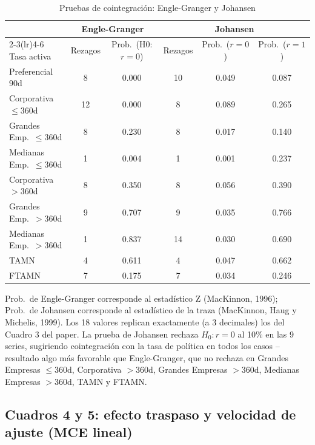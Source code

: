 \documentclass[12pt, letterpaper]{article}
\begin{document}
\begin{table}[ht]
\renewcommand{\thetable}{3}
\begin{threeparttable}
\caption{Pruebas de cointegración: Engle-Granger y Johansen}
\label{tab:cuadro3}
\small
\begin{tabular}{lccccc}
\toprule
& \multicolumn{2}{c}{Engle-Granger} & \multicolumn{3}{c}{Johansen}\\
\cmidrule(lr){2-3}\cmidrule(lr){4-6}
Tasa activa & Rezagos & Prob.\ (H0: $r=0$) & Rezagos & Prob.\ ($r=0$) & Prob.\ ($r=1$)\\
\midrule
Preferencial 90d        & 8  & 0.000 & 10 & 0.049 & 0.087 \\
Corporativa $\le$360d   & 12 & 0.000 & 8  & 0.089 & 0.265 \\
Grandes Emp.\ $\le$360d & 8  & 0.230 & 8  & 0.017 & 0.140 \\
Medianas Emp.\ $\le$360d& 1  & 0.004 & 1  & 0.001 & 0.237 \\
Corporativa $>$360d     & 8  & 0.350 & 8  & 0.056 & 0.390 \\
Grandes Emp.\ $>$360d   & 9  & 0.707 & 9  & 0.035 & 0.766 \\
Medianas Emp.\ $>$360d  & 1  & 0.837 & 14 & 0.030 & 0.690 \\
TAMN                    & 4  & 0.611 & 4  & 0.047 & 0.662 \\
FTAMN                   & 7  & 0.175 & 7  & 0.034 & 0.246 \\
\bottomrule
\end{tabular}
\begin{tablenotes}[flushleft]
\footnotesize\item
Prob.\ de Engle-Granger corresponde al estadístico Z (MacKinnon, 1996);
Prob.\ de Johansen corresponde al estadístico de la traza (MacKinnon,
Haug y Michelis, 1999). Los 18 valores replican exactamente (a 3
decimales) los del Cuadro 3 del paper. La prueba de Johansen rechaza
$H_0: r=0$ al 10\% en las 9 series, sugiriendo cointegración con la
tasa de política en todos los casos -- resultado algo más favorable
que Engle-Granger, que no rechaza en Grandes Empresas $\le$360d,
Corporativa $>$360d, Grandes Empresas $>$360d, Medianas Empresas
$>$360d, TAMN y FTAMN.
\end{tablenotes}
\end{threeparttable}
\end{table}

\subsection{Cuadros 4 y 5: efecto traspaso y velocidad de
            ajuste (MCE lineal)}
\end{document}
